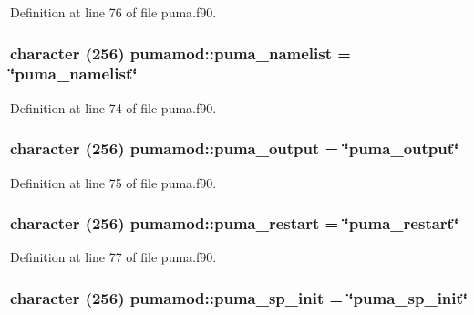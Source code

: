 \-Definition at line 76 of file puma.\-f90.

\hypertarget{classpumamod_a71c27dcf11504a05aa050a3ee4d436d1}{
\subsubsection[{puma\-\_\-namelist}]{\setlength{\rightskip}{0pt plus 5cm}character (256) {\bf pumamod\-::puma\-\_\-namelist} = \char`\"{}puma\-\_\-namelist\char`\"{}}}
\label{classpumamod_a71c27dcf11504a05aa050a3ee4d436d1}


\-Definition at line 74 of file puma.\-f90.

\hypertarget{classpumamod_a047f25dcb732cdf09b1f74fd3115126a}{
\subsubsection[{puma\-\_\-output}]{\setlength{\rightskip}{0pt plus 5cm}character (256) {\bf pumamod\-::puma\-\_\-output} = \char`\"{}puma\-\_\-output\char`\"{}}}
\label{classpumamod_a047f25dcb732cdf09b1f74fd3115126a}


\-Definition at line 75 of file puma.\-f90.

\hypertarget{classpumamod_a98f71e6dad074de1b2cb0fd1c5e531c3}{
\subsubsection[{puma\-\_\-restart}]{\setlength{\rightskip}{0pt plus 5cm}character (256) {\bf pumamod\-::puma\-\_\-restart} = \char`\"{}puma\-\_\-restart\char`\"{}}}
\label{classpumamod_a98f71e6dad074de1b2cb0fd1c5e531c3}


\-Definition at line 77 of file puma.\-f90.

\hypertarget{classpumamod_a97179af6f9ebee802a4333f951b0f436}{
\subsubsection[{puma\-\_\-sp\-\_\-init}]{\setlength{\rightskip}{0pt plus 5cm}character (256) {\bf pumamod\-::puma\-\_\-sp\-\_\-init} = \char`\"{}puma\-\_\-sp\-\_\-init\char`\"{}}}
\label{classpumamod_a97179af6f9ebee802a4333f951b0f436}


